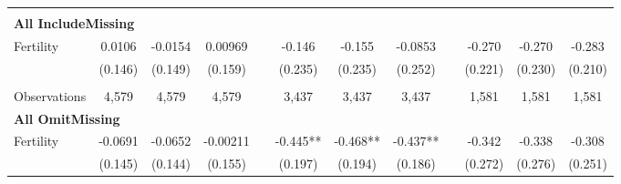 \begin{landscape}
\begin{table}[htpb!]
\begin{center}
\begin{tabular}{lcccp{2mm}cccp{2mm}ccc}
\begin{footnotesize}\end{footnotesize}\\ 
\multicolumn{12}{l}{\textbf{All IncludeMissing}}\\ 
Fertility&0.0106&-0.0154&0.00969&&-0.146&-0.155&-0.0853&&-0.270&-0.270&-0.283\\
&(0.146)&(0.149)&(0.159)&&(0.235)&(0.235)&(0.252)&&(0.221)&(0.230)&(0.210)\\
\begin{footnotesize}\end{footnotesize}&\begin{footnotesize}\end{footnotesize}&\begin{footnotesize}\end{footnotesize}&\begin{footnotesize}\end{footnotesize}&\begin{footnotesize}\end{footnotesize}&\begin{footnotesize}\end{footnotesize}&\begin{footnotesize}\end{footnotesize}&\begin{footnotesize}\end{footnotesize}&\begin{footnotesize}\end{footnotesize}&\begin{footnotesize}\end{footnotesize}&\begin{footnotesize}\end{footnotesize}&\begin{footnotesize}\end{footnotesize}\\Observations&4,579&4,579&4,579&&3,437&3,437&3,437&&1,581&1,581&1,581\\
\multicolumn{12}{l}{\textbf{All OmitMissing}}\\ 
Fertility&-0.0691&-0.0652&-0.00211&&-0.445**&-0.468**&-0.437**&&-0.342&-0.338&-0.308\\
&(0.145)&(0.144)&(0.155)&&(0.197)&(0.194)&(0.186)&&(0.272)&(0.276)&(0.251)\\

\end{tabular}
\end{center}
\end{table}
\end{landscape}
